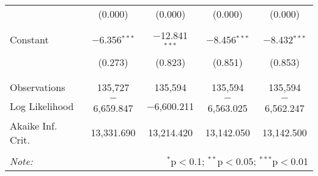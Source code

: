 \begin{table}[!htbp]
\begin{tabular}{@{\extracolsep{-5pt}}lcccc}
  & (0.000) & (0.000) & (0.000) & (0.000) \\ 
  & & & & \\ 
 Constant & $-$6.356$^{***}$ & $-$12.841$^{***}$ & $-$8.456$^{***}$ & $-$8.432$^{***}$ \\ 
  & (0.273) & (0.823) & (0.851) & (0.853) \\ 
  & & & & \\ 
\hline \\[-1.8ex] 
Observations & 135,727 & 135,594 & 135,594 & 135,594 \\ 
Log Likelihood & $-$6,659.847 & $-$6,600.211 & $-$6,563.025 & $-$6,562.247 \\ 
Akaike Inf. Crit. & 13,331.690 & 13,214.420 & 13,142.050 & 13,142.500 \\ 
\hline 
\hline \\[-1.8ex] 
\textit{Note:}  & \multicolumn{4}{r}{$^{*}$p$<$0.1; $^{**}$p$<$0.05; $^{***}$p$<$0.01} \\ 
\end{tabular} 
\end{table} 
